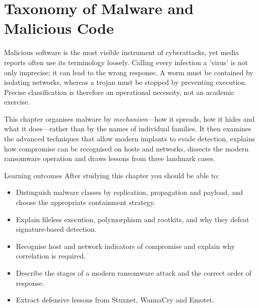 \chapter{Taxonomy of Malware and Malicious Code}\label{ch:4}

Malicious software is the most visible instrument of cyberattacks, yet media reports often use its terminology loosely. Calling every infection a 'virus' is not only imprecise; it can lead to the wrong response. A worm must be contained by isolating networks, whereas a trojan must be stopped by preventing execution. Precise classification is therefore an operational necessity, not an academic exercise.

This chapter organises malware by \emph{mechanism}—how it spreads, how it hides and what it does—rather than by the names of individual families. It then examines the advanced techniques that allow modern implants to evade detection, explains how compromise can be recognised on hosts and networks, dissects the modern ransomware operation and draws lessons from three landmark cases.

\begin{outcomesbox}{Learning outcomes}
After studying this chapter you should be able to:
\begin{itemize}
  \item Distinguish malware classes by replication, propagation and payload, and choose the appropriate containment strategy.
  \item Explain fileless execution, polymorphism and rootkits, and why they defeat signature-based detection.
  \item Recognise host and network indicators of compromise and explain why correlation is required.
  \item Describe the stages of a modern ransomware attack and the correct order of response.
  \item Extract defensive lessons from Stuxnet, WannaCry and Emotet.
\end{itemize}
\end{outcomesbox}


